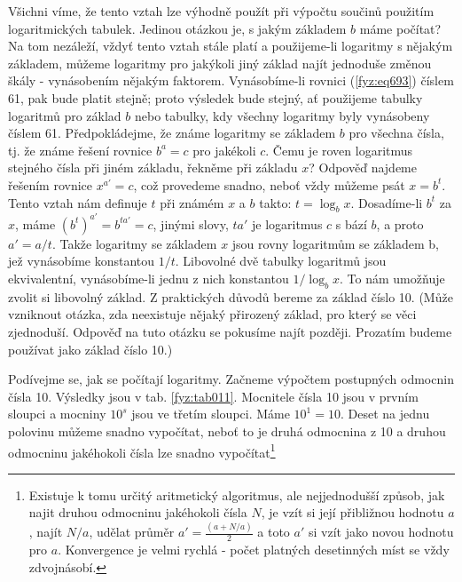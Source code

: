     Všichni víme, že tento vztah lze výhodně použít při výpočtu součinů použitím logaritmických
    tabulek. Jedinou otázkou je, s jakým základem \(b\) máme počítat? Na tom nezáleží, vždyť tento
    vztah stále platí a použijeme-li logaritmy s nějakým základem, můžeme logaritmy pro jakýkoli
    jiný základ najít jednoduše změnou škály - vynásobením nějakým faktorem. Vynásobíme-li rovnici
    (\ref{fyz:eq693}) číslem \num{61}, pak bude platit stejně; proto výsledek bude stejný, ať
    použijeme tabulky logaritmů pro základ \(b\) nebo tabulky, kdy všechny logaritmy byly vynásobeny
    číslem \num{61}. Předpokládejme, že známe logaritmy se základem \(b\) pro všechna čísla, tj. že
    známe řešení rovnice \(b^a = c\) pro jakékoli \(c\). Čemu je roven logaritmus stejného čísla při
    jiném základu, řekněme při základu \(x\)? Odpověď najdeme řešením rovnice \(x^{a'} = c\), což
    provedeme snadno, neboť vždy můžeme psát \(x = b^t\). Tento vztah nám deﬁnuje \(t\) při známém
    \(x\) a \(b\) takto: \(t= \log_bx\). Dosadíme-li \(b^t\) za \(x\), máme \((b^t)^{a'}=b^{ta'} =
    c\), jinými slovy, \(ta'\) je logaritmus \(c\) s bází \(b\), a proto \(a' =a/t\). Takže
    logaritmy se základem \(x\) jsou rovny logaritmům se základem b, jež vynásobíme konstantou
    \(1/t\). Libovolné dvě tabulky logaritmů jsou ekvivalentní, vynásobíme-li jednu z nich
    konstantou \(1/\log_bx\). To nám umožňuje zvolit si libovolný základ. Z praktických důvodů
    bereme za základ číslo 10. (Může vzniknout otázka, zda neexistuje nějaký přirozený základ, pro
    který se věci zjednoduší. Odpověď na tuto otázku se pokusíme najít později. Prozatím budeme
    používat jako základ číslo 10.)

    Podívejme se, jak se počítají logaritmy. Začneme výpočtem postupných odmocnin čísla \num{10}.
    Výsledky jsou v tab. \ref{fyz:tab011}. Mocnitele čísla \num{10} jsou v prvním sloupci a mocniny
    \(10^s\) jsou ve třetím sloupci. Máme \(10^1 = 10\). Deset na jednu polovinu můžeme snadno
    vypočítat, neboť to je druhá odmocnina z \num{10} a druhou odmocninu jakéhokoli čísla lze snadno
    vypočítat\footnote{ Existuje k tomu určitý aritmetický algoritmus, ale nejjednodušší způsob, jak
    najit druhou odmocninu jakéhokoli čísla \(N\), je vzít si její přibližnou hodnotu \(a\), najít
    \(N/a\), udělat průměr \(a' =\frac{(a + N/a)}{2}\) a toto \(a'\) si vzít jako novou hodnotu pro
    \(a\). Konvergence je velmi rychlá - počet platných desetinných míst se vždy zdvojnásobí.}

